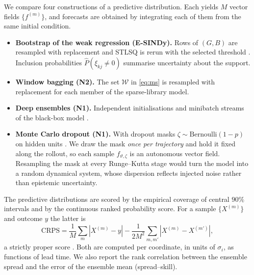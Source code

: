 We compare four constructions of a predictive distribution. Each yields $M$ vector fields $\{f^{(m)}\}$, and forecasts are obtained by integrating each of them from the same initial condition.
\begin{itemize}
  \item \textbf{Bootstrap of the weak regression (E-SINDy).} Rows of $(G,B)$ are resampled with replacement and STLSQ is rerun with the selected threshold \parencite{fasel2022esindy}. Inclusion probabilities $\hat P(\xi_{kj}\neq0)$ summarise uncertainty about the support.
  \item \textbf{Window bagging (N2).} The set $\mathcal W$ in \eqref{eq:ms} is resampled with replacement for each member of the sparse-library model.
  \item \textbf{Deep ensembles (N1).} Independent initialisations and minibatch streams of the black-box model \parencite{lakshminarayanan2017ensembles}.
  \item \textbf{Monte Carlo dropout (N1).} With dropout masks $\zeta\sim\mathrm{Bernoulli}(1-p)$ on hidden units \parencite{gal2016dropout}. We draw the mask \emph{once per trajectory} and hold it fixed along the rollout, so each sample $f_{\vartheta,\zeta}$ is an autonomous vector field. Resampling the mask at every Runge--Kutta stage would turn the model into a random dynamical system, whose dispersion reflects injected noise rather than epistemic uncertainty.
\end{itemize}
The predictive distributions are scored by the empirical coverage of central $90\%$ intervals and by the continuous ranked probability score. For a sample $\{X^{(m)}\}$ and outcome $y$ the latter is
\begin{equation}\label{eq:crps}
  \mathrm{CRPS} = \frac{1}{M}\sum_m|X^{(m)}-y| - \frac{1}{2M^2}\sum_{m,m'}|X^{(m)}-X^{(m')}| ,
\end{equation}
a strictly proper score \parencite{gneiting2007scoring}. Both are computed per coordinate, in units of $\sigma_i$, as functions of lead time. We also report the rank correlation between the ensemble spread and the error of the ensemble mean (spread--skill).
